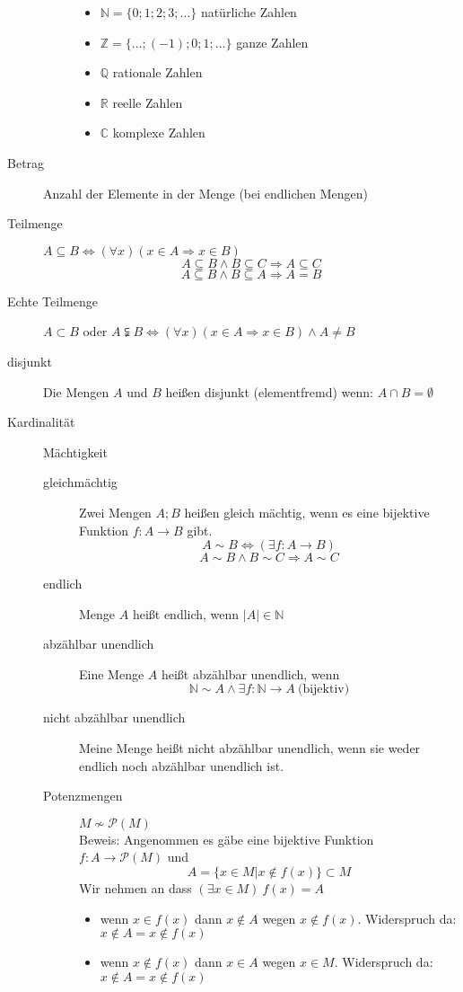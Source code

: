 \documentclass[12pt,a4paper]{article}
\begin{document}
\begin{description}
\begin{description}
				\begin{itemize}
					\item $\mathbb{N} = \lbrace 0;1;2;3;\dots \rbrace$ natürliche Zahlen
					\item $\mathbb{Z} = \lbrace \dots; (-1);0;1;\dots \rbrace$ ganze Zahlen
					\item $\mathbb{Q}$ rationale Zahlen
					\item $\mathbb{R}$ reelle Zahlen
					\item $\mathbb{C}$ komplexe Zahlen
				\end{itemize}
		\end{description}
	\item[Betrag] Anzahl der Elemente in der Menge (bei endlichen Mengen)
	\item[Teilmenge] $A \subseteq B \Leftrightarrow (\forall x)(x \in A \Rightarrow x \in B)$
		$$A \subseteq B \wedge B \subseteq C \Rightarrow A \subseteq C$$
		$$A \subseteq B \wedge B \subseteq A \Rightarrow A = B$$
	\item[Echte Teilmenge] $A \subset B$ oder $A \subsetneqq B \Leftrightarrow (\forall x)(x \in A \Rightarrow x \in B) \wedge A \not = B $
	\item[disjunkt] Die Mengen $A$ und $B$ heißen disjunkt (elementfremd) wenn: $A \cap B = \emptyset$
	\item[Kardinalität] Mächtigkeit
		\begin{description}
			\item[gleichmächtig] Zwei Mengen $A;B$ heißen gleich mächtig, wenn es eine bijektive Funktion $f : A \longrightarrow B$ gibt.
				$$A \sim B \Leftrightarrow (\exists f : A \longrightarrow B)$$
				$$A \sim B \wedge B \sim C \Rightarrow A \sim C$$
			\item[endlich] Menge $A$ heißt endlich, wenn $|A| \in \mathbb{N}$
			\item[abzählbar unendlich ] Eine Menge $A$ heißt abzählbar unendlich, wenn $$\mathbb{N} \sim A \wedge \exists f : \mathbb{N} \longrightarrow A\ \textrm{(bijektiv)}$$
			\item[nicht abzählbar unendlich] Meine Menge heißt nicht abzählbar unendlich, wenn sie weder endlich noch abzählbar unendlich ist.
				\item[Potenzmengen]$M \not \sim \mathcal{P}(M)$\\ Beweis:
				Angenommen es gäbe eine bijektive Funktion $f : A \longrightarrow \mathcal{P}(M)$ und
				$$A = \lbrace x \in M | x \not \in f(x) \rbrace \subset M$$
				Wir nehmen an dass $(\exists x \in M)\ f(x) = A$
				\begin{itemize}
					\item wenn $x \in f(x) $ dann $x \not \in A$ wegen $x \not \in f(x)$. Widerspruch da: $x \not \in A = x \not \in f(x)$
					\item wenn $x \not \in f(x)$ dann $x \in A$ wegen $x \in M$. Widerspruch da: $x \not \in A = x \not \in f(x)$
				\end{itemize}
		\end{description}
\end{description}
\end{document}
